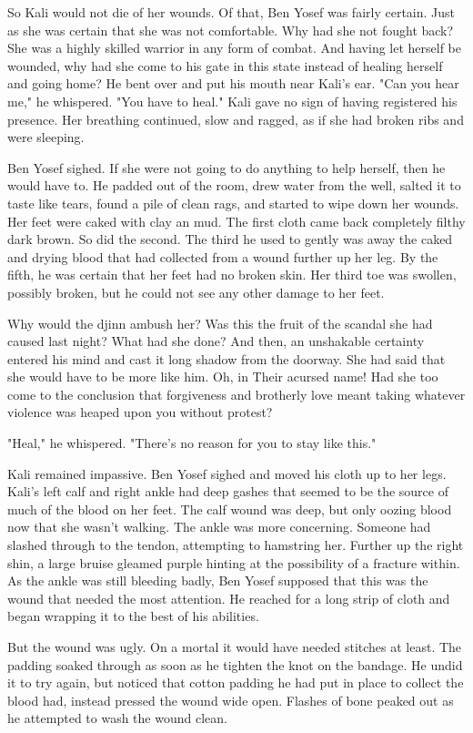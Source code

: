\documentclass{amsart}
\begin{document}
So Kali would not die of her wounds. Of that, Ben Yosef was fairly certain. Just as she was certain that she was not comfortable. Why had she not fought back? She was a highly skilled warrior in any form of combat. And having let herself be wounded, why had she come to his gate in this state instead of healing herself and going home? He bent over and put his mouth near Kali's ear. "Can you hear me," he whispered. "You have to heal." Kali gave no sign of having registered his presence. Her breathing continued, slow and ragged, as if she had broken ribs and were sleeping. 

Ben Yosef sighed. If she were not going to do anything to help herself, then he would have to. He padded out of the room, drew water from the well, salted it to taste like tears, found a pile of clean rags, and started to wipe down her wounds. Her feet were caked with clay an mud. The first cloth came back completely filthy dark brown. So did the second. The third he used to gently was away the caked and drying blood that had collected from a wound further up her leg. By the fifth, he was certain that her feet had no broken skin. Her third toe was swollen, possibly broken, but he could not see any other damage to her feet.

Why would the djinn ambush her? Was this the fruit of the scandal she had caused last night? What had she done? And then, an unshakable certainty entered his mind and cast it long shadow from the doorway. She had said that she would have to be more like him. Oh, in Their acursed name! Had she too come to the conclusion that forgiveness and brotherly love meant taking whatever violence was heaped upon you without protest?

"Heal," he whispered. "There's no reason for you to stay like this."

Kali remained impassive. Ben Yosef sighed and moved his cloth up to her legs. Kali's left calf and right ankle had deep gashes that seemed to be the source of much of the blood on her feet. The calf wound was deep, but only oozing blood now that she wasn't walking. The ankle was more concerning. Someone had slashed through to the tendon, attempting to hamstring her. Further up the right shin, a large bruise gleamed purple hinting at the possibility of a fracture within. As the ankle was still bleeding badly, Ben Yosef supposed that this was the wound that needed the most attention. He reached for a long strip of cloth and began wrapping it to the best of his abilities. 

But the wound was ugly. On a mortal it would have needed stitches at least. The padding soaked through as soon as he tighten the knot on the bandage. He undid it to try again, but noticed that cotton padding he had put in place to collect the blood had, instead pressed the wound wide open. Flashes of bone peaked out as he attempted to wash the wound clean.
\end{document}
